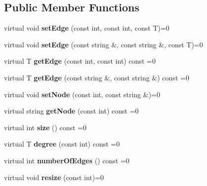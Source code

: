 \subsection*{Public Member Functions}
\begin{DoxyCompactItemize}
\item 
\mbox{\label{class_bio_adj_aa769d5822736685bff5387839fb3a718}} 
virtual void {\bfseries set\+Edge} (const int, const int, const T)=0
\item 
\mbox{\label{class_bio_adj_a1446c65a9d7c858dea0666a055319dbc}} 
virtual void {\bfseries set\+Edge} (const string \&, const string \&, const T)=0
\item 
\mbox{\label{class_bio_adj_a3958a7fb058da16d1bf99917aae4f227}} 
virtual T {\bfseries get\+Edge} (const int, const int) const =0
\item 
\mbox{\label{class_bio_adj_a625584cda56942b795cfb5aa7ff63b42}} 
virtual T {\bfseries get\+Edge} (const string \&, const string \&) const =0
\item 
\mbox{\label{class_bio_adj_adcb60a6cbe5e02272d539a8f6acbcbce}} 
virtual void {\bfseries set\+Node} (const int, const string \&)=0
\item 
\mbox{\label{class_bio_adj_a41a61bc0441f47afa830b0176334b4af}} 
virtual string {\bfseries get\+Node} (const int) const =0
\item 
\mbox{\label{class_bio_adj_a19e961d134078fa680125903209bb892}} 
virtual int {\bfseries size} () const =0
\item 
\mbox{\label{class_bio_adj_af67b3d3c3adbc270dce5e67d8c417b44}} 
virtual T {\bfseries degree} (const int) const =0
\item 
\mbox{\label{class_bio_adj_a25be2b0097f458266fdd6ee60c5c5bc0}} 
virtual int {\bfseries number\+Of\+Edges} () const =0
\item 
\mbox{\label{class_bio_adj_a8599f66bb28493d6476bfc812b1956d4}} 
virtual void {\bfseries resize} (const int)=0
\item 

\end{DoxyCompactItemize}
